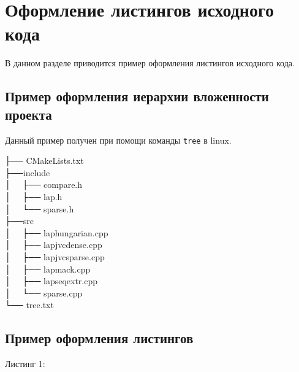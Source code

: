 \newpage\section{Оформление листингов исходного кода}

В данном разделе приводится пример оформления листингов исходного кода.

\subsection{Пример оформления иерархии вложенности проекта}

Данный пример получен при помощи команды \lstinline|tree| в linux.

\noindent
├── CMakeLists.txt\\
├──include\\
│   ├── compare.h\\
│   ├── lap.h\\
│   └── sparse.h\\
├──src\\
│   ├── laphungarian.cpp\\
│   ├── lapjvcdense.cpp\\
│   ├── lapjvcsparse.cpp\\
│   ├── lapmack.cpp\\
│   ├── lapseqextr.cpp\\
│   └── sparse.cpp\\
└── tree.txt\\

\subsection{Пример оформления листингов}

Листинг 1:

